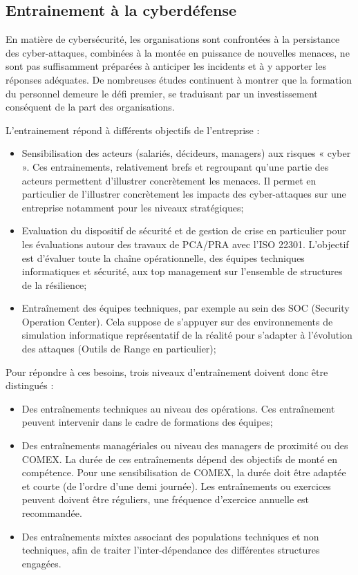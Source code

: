 \subsection{Entrainement à la cyberdéfense}

En matière de cybersécurité, les organisations sont confrontées à la persistance des cyber-attaques, combinées à la montée en puissance de nouvelles menaces, ne sont pas suffisamment préparées à anticiper les incidents et à y apporter les réponses adéquates. De nombreuses études continuent à montrer  que la formation du personnel demeure le défi premier, se traduisant par un investissement conséquent de la part des organisations.

L’entrainement répond à différents objectifs de l'entreprise  :
\begin{itemize}
  \item Sensibilisation des acteurs (salariés, décideurs, managers) aux risques « cyber ». Ces entrainements, relativement brefs et regroupant qu'une partie des acteurs  permettent d’illustrer concrètement les menaces. Il permet en particulier de l'illustrer concrètement les impacts des cyber-attaques sur une entreprise notamment pour les niveaux stratégiques;
  \item   Evaluation du dispositif de sécurité et de gestion de crise en particulier pour les évaluations autour des travaux de PCA/PRA avec l'ISO 22301. L’objectif est d'évaluer toute la chaîne opérationnelle, des équipes techniques informatiques et sécurité, aux top management sur l'ensemble de structures de la résilience;
  \item Entraînement des équipes techniques, par exemple au sein des SOC (Security Operation Center). Cela suppose de s’appuyer sur des environnements de simulation informatique représentatif de la réalité pour s'adapter à l'évolution des attaques (Outils de Range en particulier);
\end{itemize}


Pour répondre à ces besoins, trois niveaux d’entraînement doivent donc être distingués :

\begin{itemize}
  \item Des entraînements techniques au niveau des opérations. Ces entraînement peuvent intervenir dans le cadre de formations des équipes;
  \item Des entraînements managériales ou niveau des managers de proximité ou des COMEX. La durée de ces entraînements dépend des objectifs de monté en compétence. Pour une  sensibilisation de COMEX,  la durée doit être adaptée et courte (de l'ordre d'une demi journée). Les entraînements  ou exercices peuvent doivent être réguliers, une fréquence d'exercice annuelle est recommandée.
  \item Des entraînements mixtes associant des populations techniques et non techniques, afin de traiter l'inter-dépendance des différentes structures engagées.
\end{itemize}



